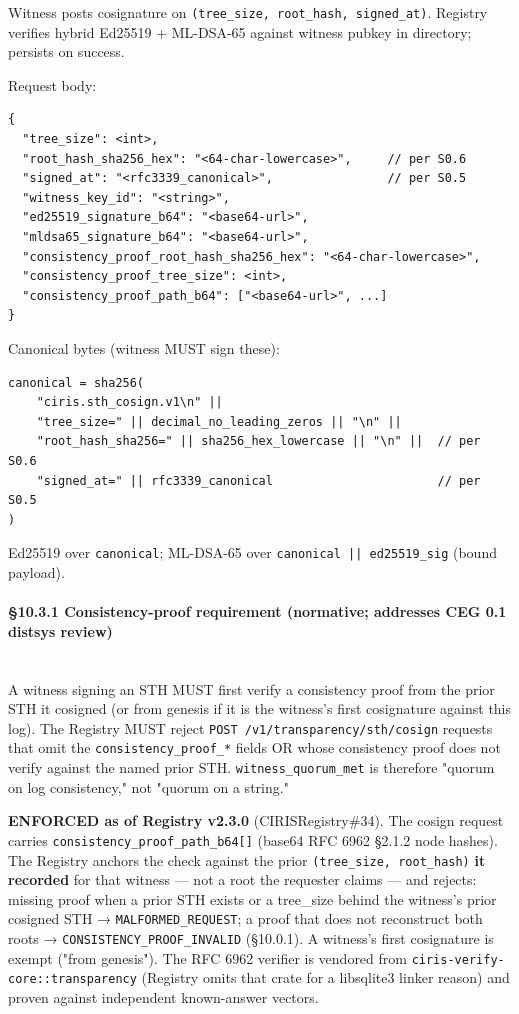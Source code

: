 \documentclass[11pt]{article}
\begin{document}
Witness posts cosignature on \texttt{(tree\_size, root\_hash, signed\_at)}. Registry verifies hybrid Ed25519 + ML-DSA-65 against witness pubkey in directory; persists on success.


Request body:


\begin{lstlisting}
{
  "tree_size": <int>,
  "root_hash_sha256_hex": "<64-char-lowercase>",     // per S0.6
  "signed_at": "<rfc3339_canonical>",                // per S0.5
  "witness_key_id": "<string>",
  "ed25519_signature_b64": "<base64-url>",
  "mldsa65_signature_b64": "<base64-url>",
  "consistency_proof_root_hash_sha256_hex": "<64-char-lowercase>",
  "consistency_proof_tree_size": <int>,
  "consistency_proof_path_b64": ["<base64-url>", ...]
}
\end{lstlisting}

Canonical bytes (witness MUST sign these):


\begin{lstlisting}
canonical = sha256(
    "ciris.sth_cosign.v1\n" ||
    "tree_size=" || decimal_no_leading_zeros || "\n" ||
    "root_hash_sha256=" || sha256_hex_lowercase || "\n" ||  // per S0.6
    "signed_at=" || rfc3339_canonical                       // per S0.5
)
\end{lstlisting}

Ed25519 over \texttt{canonical}; ML-DSA-65 over \texttt{canonical || ed25519\_sig} (bound payload).


\paragraph{§10.3.1 Consistency-proof requirement (normative; addresses CEG 0.1 distsys review)}\mbox{}\\


A witness signing an STH MUST first verify a consistency proof from the prior STH it cosigned (or from genesis if it is the witness's first cosignature against this log). The Registry MUST reject \texttt{POST /v1/transparency/sth/cosign} requests that omit the \texttt{consistency\_proof\_*} fields OR whose consistency proof does not verify against the named prior STH. \texttt{witness\_quorum\_met} is therefore "quorum on log consistency," not "quorum on a string."


\textbf{ENFORCED as of Registry v2.3.0} (CIRISRegistry\#34). The cosign request carries \texttt{consistency\_proof\_path\_b64[]} (base64 RFC 6962 §2.1.2 node hashes). The Registry anchors the check against the prior \texttt{(tree\_size, root\_hash)} \textbf{it recorded} for that witness — not a root the requester claims — and rejects: missing proof when a prior STH exists or a tree\_size behind the witness's prior cosigned STH → \texttt{MALFORMED\_REQUEST}; a proof that does not reconstruct both roots → \texttt{CONSISTENCY\_PROOF\_INVALID} (§10.0.1). A witness's first cosignature is exempt ("from genesis"). The RFC 6962 verifier is vendored from \texttt{ciris-verify-core::transparency} (Registry omits that crate for a libsqlite3 linker reason) and proven against independent known-answer vectors.
\end{document}
